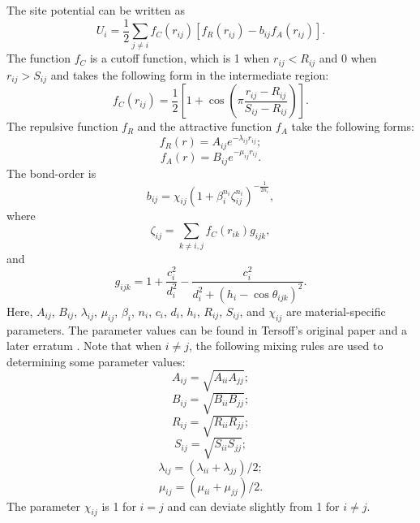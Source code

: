 \documentclass[12pt,a4paper]{report}
\begin{document}
The site potential can be written as
\begin{equation}
U_i =  \frac{1}{2} \sum_{j \neq i} f_C(r_{ij}) \left[ f_R(r_{ij}) - b_{ij} f_A(r_{ij}) \right].
\end{equation}
The function $f_{C}$ is a cutoff function, which is 1 when $r_{ij}<R_{ij}$ and 0 when  $r_{ij}>S_{ij}$ and takes the following form in the intermediate region:
\begin{equation}
f_{C}(r_{ij}) = \frac{1}{2}
\left[
1 + \cos \left( \pi \frac{r_{ij} - R_{ij}}{S_{ij} - R_{ij}} \right)
\right].
\end{equation}
The repulsive function $f_{R}$ and the attractive function $f_{A}$ take the following forms:
\begin{equation}
f_{R}(r) = A_{ij} e^{-\lambda_{ij} r_{ij}};
\end{equation}
\begin{equation}
f_{A}(r) = B_{ij} e^{-\mu_{ij} r_{ij}}.
\end{equation}
The bond-order is
\begin{equation}
\label{equation:bij}
b_{ij} = \chi_{ij} \left(1 + \beta_i^{n_i} \zeta^{n_i}_{ij}\right)^{-\frac{1}{2n_i}},
\end{equation}
where
\begin{equation}
\zeta_{ij} = \sum_{k\neq i, j}f_C(r_{ik}) g_{ijk},
\end{equation}
and
\begin{equation}
g_{ijk} = 1 + \frac{c_i^2}{d_i^2} - \frac{c_i^2}{d_i^2+(h_i-\cos\theta_{ijk})^2}.
\end{equation}
Here, $A_{ij}$, $B_{ij}$, $\lambda_{ij}$, $\mu_{ij}$, $\beta_i$, $n_i$, $c_i$, $d_i$, $h_i$, $R_{ij}$, $S_{ij}$, and $\chi_{ij}$ are material-specific parameters. The parameter values can be found in Tersoff's original paper \cite{tersoff1989prb} and a later erratum \cite{tersoff1990prb}. Note that when $i \neq j$, the following mixing rules are used to determining some parameter values:
\begin{equation}
A_{ij} =  \sqrt{A_{ii} A_{jj}};
\end{equation}
\begin{equation}
B_{ij} =  \sqrt{B_{ii} B_{jj}};
\end{equation}
\begin{equation}
R_{ij} =  \sqrt{R_{ii} R_{jj}};
\end{equation}
\begin{equation}
S_{ij} =  \sqrt{S_{ii} S_{jj}};
\end{equation}
\begin{equation}
\lambda_{ij} =  (\lambda_{ii} + \lambda_{jj})/2;
\end{equation}
\begin{equation}
\mu_{ij} =  (\mu_{ii} + \mu_{jj})/2.
\end{equation}
The parameter $\chi_{ij}$ is 1 for $i=j$ and can deviate slightly from 1 for $i \neq j$.
\end{document}
